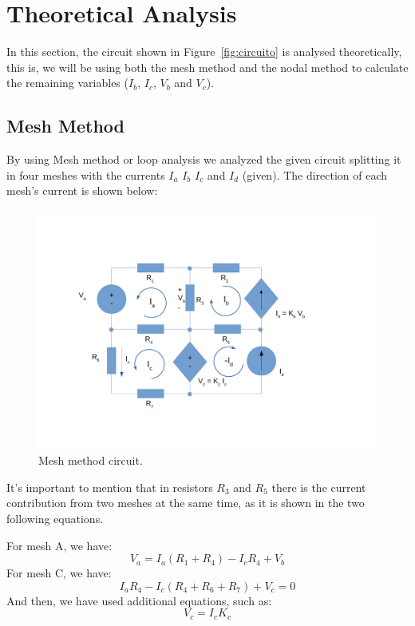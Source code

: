 \section{Theoretical Analysis}
\label{sec:analysis}

In this section, the circuit shown in Figure~\ref{fig:circuito} is analysed
theoretically, this is, we will be using both the mesh method and the nodal method to calculate the remaining variables ($I_b$, $I_c$, $V_b$ and $V_c$).

\subsection{Mesh Method}

By using Mesh method or loop analysis we analyzed the given circuit splitting it in four meshes with the currents $I_a$ $I_b$ $I_c$ and $I_d$ (given). The direction of each mesh’s current is shown below:

\begin{figure}[H] \centering
\includegraphics[width=0.7\linewidth]{malhas.pdf}
\caption{Mesh method circuit.}
\label{fig:malhas}
\end{figure}

It’s important to mention that in resistors $R_3$ and $R_5$ there is the current contribution from two meshes at the same time, as it is shown in the two following equations. \par
For mesh A, we have:
\begin{equation}
  V_a = I_a (R_1+R_4)-I_c R_4 + V_b
  \label{eq1}
\end{equation}
For mesh C, we have:
\begin{equation}
  I_a R_4 - I_c (R_4+R_6+R_7) + V_c = 0
  \label{eq2}
\end{equation}
And then, we have used additional equations, such as:
\begin{equation}
  V_c = I_c K_c
  \label{eq3}
\end{equation}

